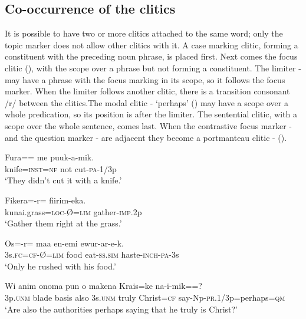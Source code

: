 \subsection{Co-occurrence of the clitics}
{}
It is possible to have two or more clitics attached to the same word; only the topic marker does not allow other clitics with it. A case marking clitic, forming a constituent with the preceding noun phrase, is placed first. Next comes the focus clitic (), with the scope over a phrase but not forming a constituent. The limiter \nobreakdash- may have a phrase with the focus marking in its scope, so it follows the focus marker. When the limiter follows another clitic, there is a transition consonant /r/ between the clitics.The modal clitic \nobreakdash- `perhaps' () may have a scope over a whole predication, so its position is after the limiter. The sentential clitic, with a scope over the whole sentence, comes last. When the contrastive focus marker - and the question marker - are adjacent they become a portmanteau clitic - ().

\ea%
\label{ex:x792}
\gll Fura== me puuk-a-mik. \\
knife=\textsc{inst}=\textsc{nf} not cut-\textsc{pa}-1/3p\\
\glt`They didn't cut it with a knife.'
\z

\ea%
\label{ex:x795}
\gll Fikera=-r= fiirim-eka. \\
kunai.grass=\textsc{loc}-{\O}=\textsc{lim} gather-\textsc{imp}.2p\\
\glt`Gather them right at the  grass.'
\z

\ea%
\label{ex:x796}
\gll Os=-r= maa en-emi ewur-ar-e-k. \\
3s.\textsc{fc}=\textsc{cf}-{\O}=\textsc{lim} food eat-\textsc{ss}.\textsc{sim} haste-\textsc{inch}-\textsc{pa}-3s\\
\glt`Only he rushed with his food.'
\z

\ea%
\label{ex:x793}
\gll Wi anim onoma pun o makena Krais=ke na-i-mik==?\\
3p.\textsc{unm} blade basis also 3s.\textsc{unm} truly Christ=\textsc{cf} say-Np-\textsc{pr}.1/3p=perhaps=\textsc{qm}\\
\glt`Are also the authorities perhaps saying that he truly is Christ?'
\z

